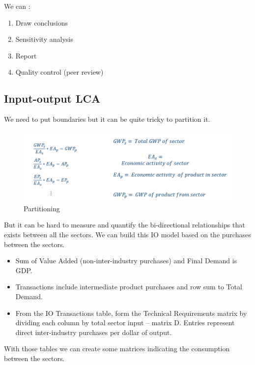 We can :

\begin{enumerate}
\def\labelenumi{\arabic{enumi}.}
\tightlist
\item
  Draw conclusions
\item
  Sensitivity analysis
\item
  Report
\item
  Quality control (peer review)
\end{enumerate}

\hypertarget{input-output-lca}{%
\subsection{Input-output LCA}\label{input-output-lca}}

We need to put boundaries but it can be quite tricky to partition it.

\begin{figure}
\centering
\includegraphics{image-6.png}
\caption{Partitioning}
\end{figure}

But it can be hard to measure and quantify the bi-directional
relationships that exists between all the sectors. We can build this IO
model based on the purchases between the sectors.

\begin{itemize}
\tightlist
\item
  Sum of Value Added (non-inter-industry purchases) and Final Demand is
  GDP.
\item
  Transactions include intermediate product purchases and row sum to
  Total Demand.
\item
  From the IO Transactions table, form the Technical Requirements matrix
  by dividing each column by total sector input -- matrix D. Entries
  represent direct inter-industry purchases per dollar of output.
\end{itemize}

With those tables we can create some matrices indicating the consumption
between the sectors.

